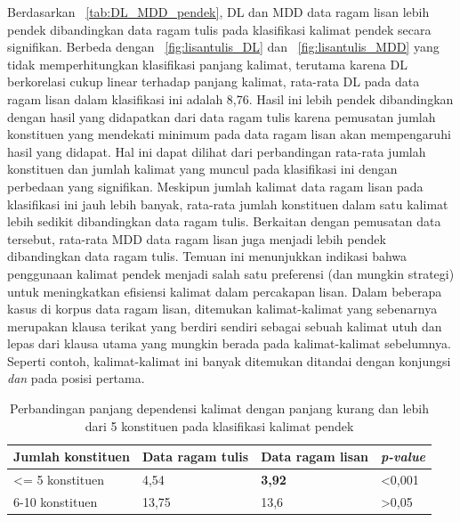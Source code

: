 Berdasarkan \tab~\ref{tab:DL_MDD_pendek}, DL dan MDD data ragam lisan lebih pendek dibandingkan data ragam tulis pada klasifikasi kalimat pendek secara signifikan. Berbeda dengan \pic~\ref{fig:lisantulis_DL}  dan \pic~\ref{fig:lisantulis_MDD} yang tidak memperhitungkan klasifikasi panjang kalimat, terutama karena DL berkorelasi cukup linear terhadap panjang kalimat, rata-rata DL pada data ragam lisan dalam klasifikasi ini adalah 8,76. Hasil ini lebih pendek dibandingkan dengan hasil yang didapatkan dari data ragam tulis karena pemusatan jumlah konstituen yang mendekati minimum pada data ragam lisan akan mempengaruhi hasil yang didapat. Hal ini dapat dilihat dari perbandingan rata-rata jumlah konstituen dan jumlah kalimat yang muncul pada klasifikasi ini dengan perbedaan yang signifikan. Meskipun jumlah kalimat data ragam lisan pada klasifikasi ini jauh lebih banyak, rata-rata jumlah konstituen dalam satu kalimat lebih sedikit dibandingkan data ragam tulis.  Berkaitan dengan pemusatan data tersebut, rata-rata MDD data ragam lisan juga menjadi lebih pendek dibandingkan data ragam tulis. Temuan ini menunjukkan indikasi bahwa penggunaan kalimat pendek menjadi salah satu preferensi (dan mungkin strategi)  untuk meningkatkan efisiensi kalimat dalam percakapan lisan. Dalam beberapa kasus di korpus data ragam lisan, ditemukan kalimat-kalimat yang sebenarnya merupakan klausa terikat yang berdiri sendiri sebagai sebuah kalimat utuh dan lepas dari klausa utama yang mungkin berada pada kalimat-kalimat sebelumnya. Seperti contoh, kalimat-kalimat ini banyak ditemukan ditandai dengan konjungsi \textit{dan} pada posisi pertama. 

\begin{table}
\begin{center}
\begin{small}
\caption{Perbandingan panjang dependensi kalimat dengan panjang kurang dan lebih dari 5 konstituen pada klasifikasi kalimat pendek}\label{tab:DL_5}
  \begin{tabular}{ | p{3.2cm} | p{3.2cm} | p{3.2cm} | p{2cm} |}
    \hline
Jumlah konstituen & Data ragam tulis & Data ragam lisan & \textit{p-value} \\ \hline
\textless= 5 konstituen & 4,54 & \textbf{3,92} & \textless 0,001 \\ \hline
6-10 konstituen & 13,75 & 13,6 & \textgreater 0,05 \\ \hline
   \end{tabular}
   \end{small}
\end{center}
\end{table}

